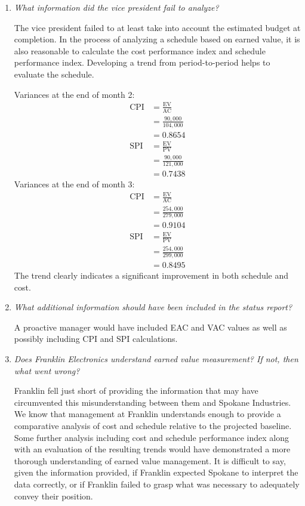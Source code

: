 \documentclass[letterpaper,10pt]{article}
\begin{document}
\begin{enumerate}
\item \emph{What information did the vice president fail to analyze?}
\par The vice president failed to at least take into account the estimated budget at completion.  In the process of analyzing a schedule based on earned value, it is also reasonable to calculate the cost performance index and schedule performance index.  Developing a trend from period-to-period helps to evaluate the schedule.
\par Variances at the end of month 2:
\begin{align*}
\mbox{CPI} &= \frac{\mbox{EV}}{\mbox{AC}} \\
&= \frac{90,000}{104,000} \\
&= 0.8654 \\
\mbox{SPI} &= \frac{\mbox{EV}}{\mbox{PV}} \\
&= \frac{90,000}{121,000} \\
&= 0.7438
\end{align*}
Variances at the end of month 3:
\begin{align*}
\mbox{CPI} &= \frac{\mbox{EV}}{\mbox{AC}} \\
&= \frac{254,000}{279,000} \\
&= 0.9104 \\
\mbox{SPI} &= \frac{\mbox{EV}}{\mbox{PV}} \\
&= \frac{254,000}{299,000} \\
&= 0.8495
\end{align*}
The trend clearly indicates a significant improvement in both schedule and cost.

\item \emph{What additional information should have been included in the status report?}
\par A proactive manager would have included EAC and VAC values as well as possibly including CPI and SPI calculations.

\item \emph{Does Franklin Electronics understand earned value measurement?  If not, then what went wrong?}
\par Franklin fell just short of providing the information that may have circumvented this misunderstanding between them and Spokane Industries.  We know that management at Franklin understands enough to provide a comparative analysis of cost and schedule relative to the projected baseline.  Some further analysis including cost and schedule performance index along with an evaluation of the resulting trends would have demonstrated a more thorough understanding of earned value management.  It is difficult to say, given the information provided, if Franklin expected Spokane to interpret the data correctly, or if Franklin failed to grasp what was necessary to adequately convey their position.


\end{enumerate}
\end{document}
